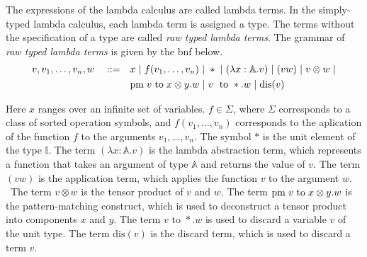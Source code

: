 The expressions of the lambda calculus are called lambda terms. In the simply-typed lambda calculus, each lambda term is assigned a type. The terms without the specification of a type are called \emph{raw typed lambda terms}. The grammar of \emph{raw typed lambda terms} is given by the \acrshort{bnf} below.
\begin{equation*} \label{eq:grammarlambda}
\begin{split}
 v,v_1, \ldots, v_n,w \hspace{10 pt} ::= \hspace{10 pt}& x \hspace{3 pt} \vert \hspace{3 pt} f(v_1, \ldots, v_n) \hspace{3 pt} \vert \hspace{3 pt} *  \hspace{3 pt} \vert \hspace{3 pt} (\lambda x: \mathbb{A}. v )\hspace{3 pt} \vert \hspace{3 pt} (v w) \hspace{3 pt}  \vert \hspace{3 pt} v \otimes w \hspace{3 pt} \vert
 \\&    \text{pm} \hspace{3 pt} v \hspace{3 pt} \text{to} \hspace{3 pt} x \otimes y. w  \hspace{3 pt}  \vert \hspace{3 pt} v \hspace{3 pt} \text{ to } *.w \hspace{3 pt} \vert \hspace{3 pt} \text{dis}(v)
\end{split}
\end{equation*}

Here $x$ ranges over an infinite set of variables. $f \in \Sigma$, where  $\Sigma$ corresponds to a class of sorted operation symbols, and $f(v_1, \ldots, v_n)$ corresponds to the aplication of the function $f$ to the arguments $v_1, \ldots, v_n$. The symbol $*$ is the unit element of the type $\mathbb{I}$. The term $(\lambda x: \mathbb{A}. v )$ is the lambda abstraction term, which represents a function that takes an argument of type $\mathbb{A}$ and returns the value of $v$. The term $(v w)$ is the application term, which applies the function $v$ to the argument $w$.  The term $v \otimes w$ is the tensor product of $v$ and $w$. The term $\text{pm} \hspace{3 pt} v \hspace{3 pt} \text{to} \hspace{3 pt} x \otimes y. w$ is the pattern-matching construct, which is used to deconstruct a tensor product into components $x$ and $y$. The term $v \text{ to } *.w$ is used to discard a variable $v$ of the unit type. The term $\text{dis}(v)$ is the discard term, which is used to discard a term $v$. 

